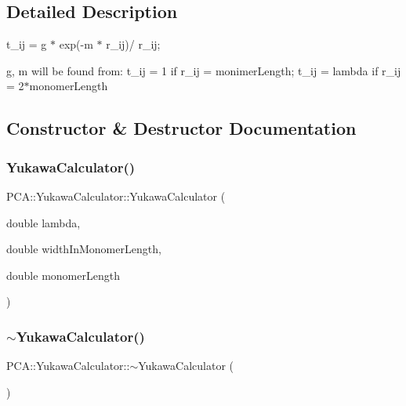 \subsection{Detailed Description}
t\+\_\+ij = g $\ast$ exp(-\/m $\ast$ r\+\_\+ij)/ r\+\_\+ij; 

g, m will be found from\+: t\+\_\+ij = 1 if r\+\_\+ij = monimer\+Length; t\+\_\+ij = lambda if r\+\_\+ij = 2$\ast$monomer\+Length 

\subsection{Constructor \& Destructor Documentation}
\hypertarget{class_p_c_a_1_1_yukawa_calculator_a8e905580206166f9b63fa24171d48346}{}\label{class_p_c_a_1_1_yukawa_calculator_a8e905580206166f9b63fa24171d48346} 
\subsubsection{\texorpdfstring{Yukawa\+Calculator()}{YukawaCalculator()}}
{\footnotesize\ttfamily P\+C\+A\+::\+Yukawa\+Calculator\+::\+Yukawa\+Calculator (\begin{DoxyParamCaption}\item[{double}]{lambda,  }\item[{double}]{width\+In\+Monomer\+Length,  }\item[{double}]{monomer\+Length }\end{DoxyParamCaption})}

\hypertarget{class_p_c_a_1_1_yukawa_calculator_ab9dcb06991228cb9a48f773ee3375603}{}\label{class_p_c_a_1_1_yukawa_calculator_ab9dcb06991228cb9a48f773ee3375603} 
\subsubsection{\texorpdfstring{$\sim$\+Yukawa\+Calculator()}{~YukawaCalculator()}}
{\footnotesize\ttfamily P\+C\+A\+::\+Yukawa\+Calculator\+::$\sim$\+Yukawa\+Calculator (\begin{DoxyParamCaption}{ }\end{DoxyParamCaption})}



